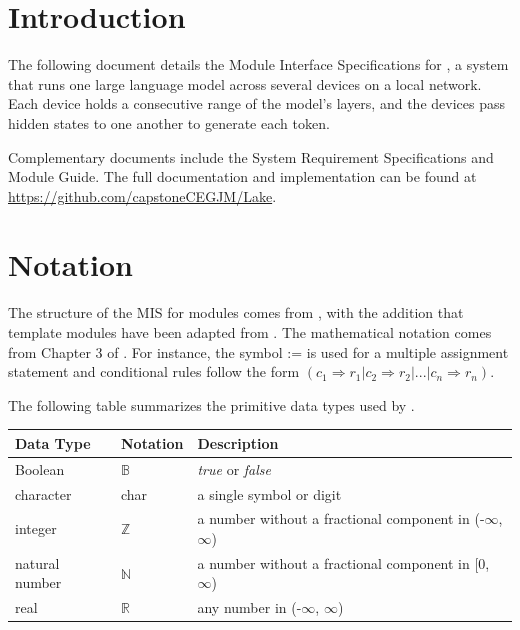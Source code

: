 \documentclass[12pt, titlepage]{article}
\begin{document}
\newpage

\tableofcontents

\newpage


\section{Introduction}

The following document details the Module Interface Specifications for
\progname{}, a system that runs one large language model across several
devices on a local network. Each device holds a consecutive range of the
model's layers, and the devices pass hidden states to one another to generate
each token.

Complementary documents include the System Requirement Specifications
and Module Guide.  The full documentation and implementation can be
found at \url{https://github.com/capstoneCEGJM/Lake}.

\section{Notation}

The structure of the MIS for modules comes from \citet{HoffmanAndStrooper1995},
with the addition that template modules have been adapted from
\cite{GhezziEtAl2003}.  The mathematical notation comes from Chapter 3 of
\citet{HoffmanAndStrooper1995}.  For instance, the symbol := is used for a
multiple assignment statement and conditional rules follow the form $(c_1
\Rightarrow r_1 | c_2 \Rightarrow r_2 | ... | c_n \Rightarrow r_n )$.

The following table summarizes the primitive data types used by \progname. 

\begin{center}
\renewcommand{\arraystretch}{1.2}
\noindent 
\begin{tabular}{l l p{7.5cm}} 
\toprule 
\textbf{Data Type} & \textbf{Notation} & \textbf{Description}\\ 
\midrule
Boolean & $\mathbb{B}$ & \textit{true} or \textit{false}\\
character & char & a single symbol or digit\\
integer & $\mathbb{Z}$ & a number without a fractional component in (-$\infty$, $\infty$) \\
natural number & $\mathbb{N}$ & a number without a fractional component in [0, $\infty$) \\
real & $\mathbb{R}$ & any number in (-$\infty$, $\infty$)\\
\bottomrule
\end{tabular}
\end{center}
\end{document}
